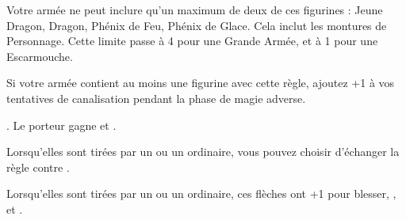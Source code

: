\armyspecialruleentry{\lastoftheirkind}
{Votre armée ne peut inclure qu'un maximum de deux de ces figurines : Jeune Dragon, Dragon, Phénix de Feu, Phénix de Glace. Cela inclut les montures de Personnage. Cette limite passe à 4 pour une Grande Armée, et à 1 pour une Escarmouche.}

\armyspecialruleentry{\masterofbalance}
Si votre armée contient au moins une figurine avec cette règle, ajoutez +1 à vos tentatives de canalisation pendant la phase de magie adverse.

\closearmyspecialrules

\vspace*{1.5cm}
\startarmyarmoury

\startitemlistonecol

\listitemonecol{\dragonforgedarmour} \ha. Le porteur gagne \fireborn et .

\listitemonecol{\bitterarrows} Lorsqu'elles sont tirées par un \bow ou un \longbow ordinaire, vous pouvez choisir d'échanger la règle \volleyfire contre \poisonedattacks. 

\listitemonecol{\moonlightarrows} Lorsqu'elles sont tirées par un \bow ou un \longbow ordinaire, ces flèches ont +1 pour blesser, \flamingattacks, \magicalattacks et .

\enditemlistonecol

\closearmyarmoury


\startarmynewsection{\honours}
\spaceaftersection{}


